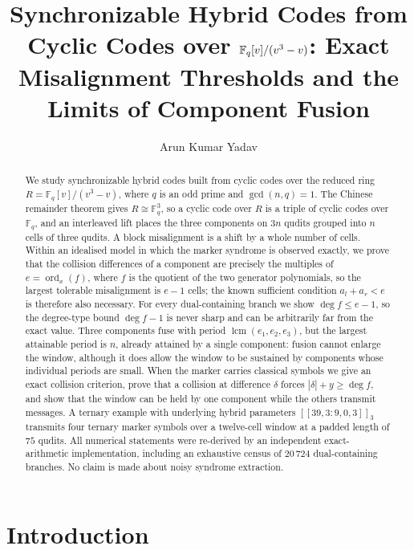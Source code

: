 \documentclass[11pt,reqno]{amsart}
\title[Quantum Synchronizable Hybrid Codes]{Synchronizable Hybrid Codes from Cyclic Codes over $\F_q[v]/(v^3-v)$: Exact Misalignment Thresholds and the Limits of Component Fusion}
\author{Arun Kumar Yadav}
\theoremstyle{definition}
\theoremstyle{remark}
\newcommand{\F}{\mathbb{F}}
\newcommand{\ord}{\operatorname{ord}}
\newcommand{\lcm}{\operatorname{lcm}}
\begin{document}
\begin{abstract}
We study synchronizable hybrid codes built from cyclic codes over the reduced ring $R=\F_q[v]/(v^3-v)$, where $q$ is an odd prime and $\gcd(n,q)=1$. The Chinese remainder theorem gives $R\cong\F_q^3$, so a cyclic code over $R$ is a triple of cyclic codes over $\F_q$, and an interleaved lift places the three components on $3n$ qudits grouped into $n$ cells of three qudits. A block misalignment is a shift by a whole number of cells. Within an idealised model in which the marker syndrome is observed exactly, we prove that the collision differences of a component are precisely the multiples of $e=\ord_x(f)$, where $f$ is the quotient of the two generator polynomials, so the largest tolerable misalignment is $e-1$ cells; the known sufficient condition $a_l+a_r<e$ is therefore also necessary. For every dual-containing branch we show $\deg f\le e-1$, so the degree-type bound $\deg f-1$ is never sharp and can be arbitrarily far from the exact value. Three components fuse with period $\lcm(e_1,e_2,e_3)$, but the largest attainable period is $n$, already attained by a single component: fusion cannot enlarge the window, although it does allow the window to be sustained by components whose individual periods are small. When the marker carries classical symbols we give an exact collision criterion, prove that a collision at difference $\delta$ forces $|\delta|+y\ge\deg f$, and show that the window can be held by one component while the others transmit messages. A ternary example with underlying hybrid parameters $[[39,3:9,0,3]]_3$ transmits four ternary marker symbols over a twelve-cell window at a padded length of $75$ qudits. All numerical statements were re-derived by an independent exact-arithmetic implementation, including an exhaustive census of $20\,724$ dual-containing branches. No claim is made about noisy syndrome extraction.
\end{abstract}

\maketitle


\section{Introduction}\label{sec:introduction}
\end{document}
